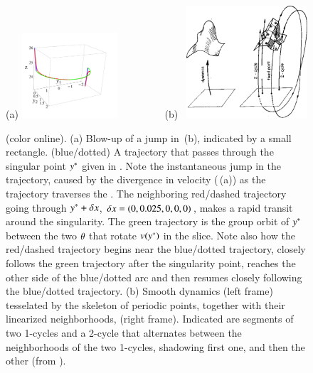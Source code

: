 \documentclass[preprint,12pt]{elsarticle} %
\begin{document}
 \begin{figure}
 \begin{center}
(a) \includegraphics[width=0.32\textwidth]{singpass1}%
~~~~~~~~
(b)~ \includegraphics[width=0.40\textwidth]{f_1_08_1}
 \end{center}
 \caption{\label{fig:singpass}
(color online).
(a)
Blow-up of a jump in \,(b), indicated by a small
rectangle.
(blue/dotted) A trajectory that passes through the singular point
$y^*$ given in . Note the instantaneous jump in
the trajectory,  caused by the divergence in velocity
(\,(a)) as the trajectory traverses the {\sset}.
The neighboring red/dashed trajectory going through $y^*+\delta
x$, $\delta x =(0,0.025,0,0,0)$, makes a rapid transit around the
singularity. The green trajectory is the group orbit of $y^*$
between the two ${\bf \theta}$ that rotate $v(y^*)$ in the slice. Note
also how the red/dashed trajectory begins near the blue/dotted
trajectory, closely follows the green trajectory after the singularity
point, reaches the other side of the blue/dotted arc and then resumes
closely following the blue/dotted trajectory.
(b)
Smooth dynamics  (left frame) tesselated by the skeleton of periodic
points, together with their linearized neighborhoods, (right frame).
Indicated are segments of two 1-cycles and a 2-cycle that alternates
between the neighborhoods of the two 1-cycles, shadowing first one, and
then the other
(from \wwwcb{}).
 }%
 \end{figure}
\end{document}
